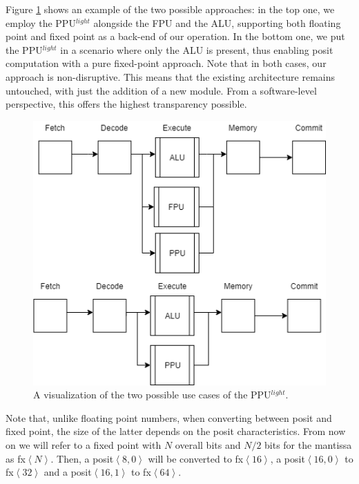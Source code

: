 Figure \ref{fig:use_cases} shows an example of the two possible approaches: in the top one, we employ the PPU$^{light}$ alongside the  FPU  and  the  ALU,  supporting  both  floating  point  and fixed  point  as  a  back-end  of  our  operation.  In  the  bottom one, we put the  PPU$^{light}$ in a scenario where only the ALU is present, thus enabling posit computation with a pure fixed-point approach. Note that in both cases, our approach is non-disruptive. This means that the existing architecture remains untouched, with just the addition of a new module. From a software-level perspective, this offers the highest transparency possible.


\begin{figure}
    \centering
    \includegraphics[width=0.5\linewidth]{img/use_cases.png}
    \caption{A visualization of the two possible use cases of the PPU$^{light}$. }
    \label{fig:use_cases}
\end{figure}



Note that, unlike floating point numbers, when converting between posit and fixed point, the size of the latter depends on the posit characteristics. From now on we will refer to  a fixed point with $N$ overall bits and $N/2$ bits for the mantissa  as fx$\left<N\right>$. Then, a posit$\left<8,0\right>$ will be converted to fx$\left<16\right>$,  a posit$\left<16,0\right>$ to fx$\left<32\right>$ and a posit$\left<16,1\right>$ to fx$\left<64\right>$.

